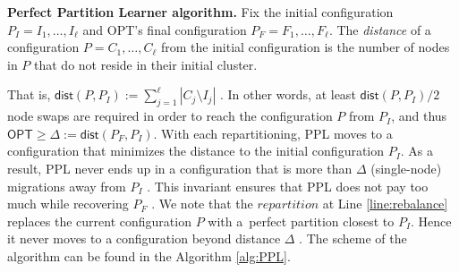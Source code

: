 \documentclass[manuscript,screen=true, review, anonymous]{acmart}
\newcommand{\OPT}{\textsf{OPT}\xspace}
\newcommand{\PPL}{\textsf{PPL}\xspace}
\newcommand{\dist}{\textsf{dist}}
\newcommand\maciek[1]{}
\begin{document}
\maciek{The remainder of the paper used "configuration C" to denote the partition P. Easiest to adjust here.}

\noindent
\textbf{Perfect Partition Learner algorithm.}
Fix the initial configuration
$P_I = I_1, \dots, I_{\ell}$ and \OPT's final configuration
$P_F = F_1, \dots, F_{\ell}$\maciek{How do we define a configuration?}.
The \emph{distance} of a configuration $P = C_1, \dots, C_{\ell}$ from the initial configuration \maciek{, denoted $\dist(P)$} is the number of nodes in $P$ that do not reside in their initial cluster.
\maciek{We might denote distance $\Delta(P)$, and the current $\Delta$ might be R (like radius).}
That is,
$\dist(P, P_I) := \sum_{j=1}^{\ell} | C_j \setminus I_j |$
\maciek{Major: what does this definition mean? This is highly unclear, most likely because a configuration was not defined.}. 
In other words,
at least $\dist(P, P_I)/2$ node swaps are required in order to reach the configuration $P$ from $P_I$, and thus
$\OPT \geq \Delta:= \dist(P_F, P_I) $.
With each repartitioning,
\PPL moves to a configuration that minimizes the distance to the initial configuration $P_I$.
As a result,
\PPL never ends up \maciek{ends up is informal} in a configuration that is more than $\Delta$ (single-node) migrations away from $P_I$ \maciek{This is not an algorithm definition, that's its property. Should not be in this paragraph}.
This invariant ensures that \PPL does not pay too much while recovering $P_F$ \maciek{Recovering $P_F$? It's not the goal. At least at this point the reader is confused: it does not know yet that PPL is proven to end up in $P_F$}.
We note \maciek{Define?} that the $\mathit{repartition}$ at Line \ref{line:rebalance} replaces the current configuration $P$ with a~perfect partition closest to $P_I$.
Hence it never moves to a configuration beyond distance $\Delta$ \maciek{This is again mixing the properties of ppl and its definition. Restructure}.
The scheme of the algorithm can be found in the Algorithm \ref{alg:PPL}.
\end{document}
